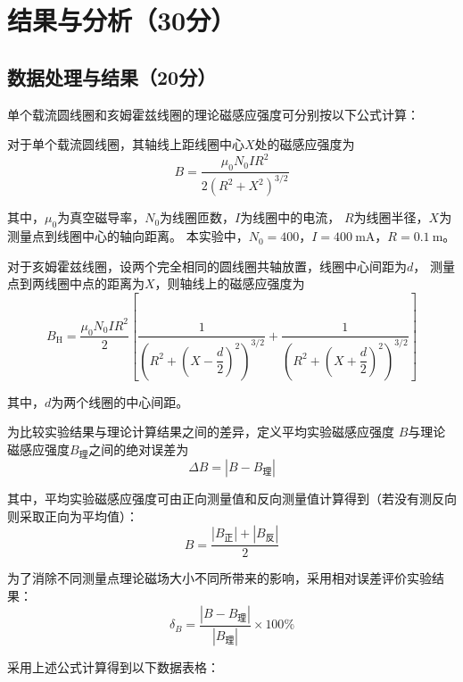 \documentclass[10pt,a4paper]{ctexart} %
\begin{document}
\section{结果与分析（30分）}

  \subsection{数据处理与结果（20分）} 
  单个载流圆线圈和亥姆霍兹线圈的理论磁感应强度可分别按以下公式计算：

  对于单个载流圆线圈，其轴线上距线圈中心$X$处的磁感应强度为
  \[
    B
    =
    \frac{\mu_0 N_0 I R^2}
    {2\left(R^2+X^2\right)^{3/2}}
  \]
  
  其中，$\mu_0$为真空磁导率，$N_0$为线圈匝数，$I$为线圈中的电流，
  $R$为线圈半径，$X$为测量点到线圈中心的轴向距离。
  本实验中，$N_0=400$，$I=400\ \mathrm{mA}$，$R=0.1\ \mathrm{m}$。

  对于亥姆霍兹线圈，设两个完全相同的圆线圈共轴放置，线圈中心间距为$d$，
  测量点到两线圈中点的距离为$X$，则轴线上的磁感应强度为
  \[
    B_{\mathrm{H}}
    =
    \frac{\mu_0 N_0 I R^2}{2}
    \left[
        \frac{1}
        {\left(R^2+\left(X-\dfrac{d}{2}\right)^2\right)^{3/2}}
        +
        \frac{1}
        {\left(R^2+\left(X+\dfrac{d}{2}\right)^2\right)^{3/2}}
    \right]
  \]
  
  其中，$d$为两个线圈的中心间距。

  为比较实验结果与理论计算结果之间的差异，定义平均实验磁感应强度
  $B$与理论磁感应强度$B_{\text{理}}$之间的绝对误差为
  \[
    \Delta B
    =
    \left|B-B_{\text{理}}\right|
  \]

  其中，平均实验磁感应强度可由正向测量值和反向测量值计算得到（若没有测反向则采取正向为平均值）：
  \[
    B
    =
    \frac{\left|B_{\text{正}}\right|
    +\left|B_{\text{反}}\right|}{2}
  \]

  为了消除不同测量点理论磁场大小不同所带来的影响，采用相对误差评价实验结果：
  \[
    \delta_B
    =
    \frac{\left|B-B_{\text{理}}\right|}
    {\left|B_{\text{理}}\right|}
    \times 100\%
  \]
  
  采用上述公式计算得到以下数据表格：
\end{document}
